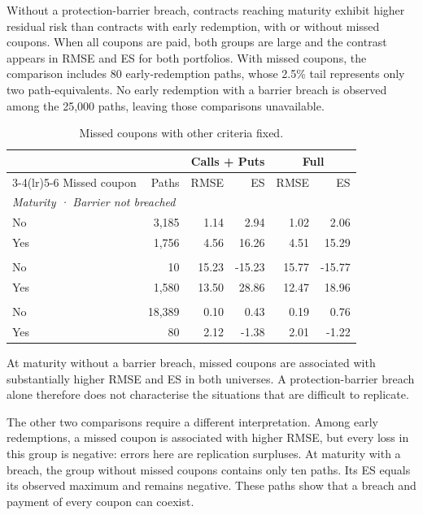 \documentclass[12pt,a4paper]{article}
\newcommand{\1}{\mathbf{1}}
\begin{document}
Without a protection-barrier breach, contracts reaching maturity exhibit higher residual risk than contracts with early redemption, with or without missed coupons. When all coupons are paid, both groups are large and the contrast appears in RMSE and ES for both portfolios. With missed coupons, the comparison includes 80 early-redemption paths, whose 2.5\% tail represents only two path-equivalents. No early redemption with a barrier breach is observed among the 25,000 paths, leaving those comparisons unavailable.

\begin{table}[H]
\centering
\small
\setlength{\tabcolsep}{4pt}
\begin{tabular}{lrrrrr}
\toprule
 & & \multicolumn{2}{c}{Calls + Puts} & \multicolumn{2}{c}{Full} \\
\cmidrule(lr){3-4}\cmidrule(lr){5-6}
Missed coupon & Paths & RMSE & ES & RMSE & ES \\
\midrule
\multicolumn{6}{l}{\textit{Maturity · Barrier not breached}} \\
\addlinespace[2pt]
No & 3,185 & 1.14 & 2.94 & 1.02 & 2.06 \\
Yes & 1,756 & 4.56 & 16.26 & 4.51 & 15.29 \\
\addlinespace[4pt]
\multicolumn{6}{l}{\textit{Maturity · Barrier breached}} \\
\addlinespace[2pt]
No & 10 & 15.23 & -15.23 & 15.77 & -15.77 \\
Yes & 1,580 & 13.50 & 28.86 & 12.47 & 18.96 \\
\addlinespace[4pt]
\multicolumn{6}{l}{\textit{Early redemption · Barrier not breached}} \\
\addlinespace[2pt]
No & 18,389 & 0.10 & 0.43 & 0.19 & 0.76 \\
Yes & 80 & 2.12 & -1.38 & 2.01 & -1.22 \\
\bottomrule
\end{tabular}

\caption{Missed coupons with other criteria fixed.}
\label{tab:tail-group-risk}
\end{table}

At maturity without a barrier breach, missed coupons are associated with substantially higher RMSE and ES in both universes. A protection-barrier breach alone therefore does not characterise the situations that are difficult to replicate.

The other two comparisons require a different interpretation. Among early redemptions, a missed coupon is associated with higher RMSE, but every loss in this group is negative: errors here are replication surpluses. At maturity with a breach, the group without missed coupons contains only ten paths. Its ES equals its observed maximum and remains negative. These paths show that a breach and payment of every coupon can coexist.
\end{document}
